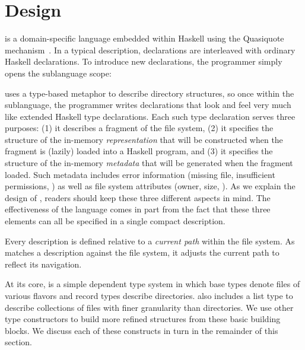 \section{\forest{} Design}
\label{sec:language}

\forest{} is a domain-specific language embedded within Haskell using
the Quasiquote mechanism~\cite{Mainland:quasi}.  In a typical
\forest{} description, \forest{} declarations are interleaved with ordinary
Haskell declarations.  To introduce new \forest{} declarations,
the programmer simply opens the \forest{} sublanguage scope:
\begin{code}
\end{code}

\forest{} uses a type-based metaphor to describe directory
structures, so once  within the \forest{} sublanguage, the programmer
writes declarations that look and feel very much like extended Haskell
type declarations. 
Each such type declaration serves three purposes: 
(1) it describes a fragment of the file system,
(2) it specifies the structure of the in-memory {\em representation}
    that will be constructed when the fragment is (lazily) loaded into a Haskell program, and 
(3) it specifies the structure of the in-memory {\em metadata}
    that will be generated when the fragment loaded.
Such metadata includes error information (missing file, insufficient
permissions, \etc{})  as well as file system attributes (owner, size, \etc{}).
As we explain the design of \forest{}, 
readers should keep these three different aspects in mind.  
The effectiveness of the \forest{} language comes in part from the fact that these three 
elements can all be specified in a single compact description.  

Every \forest{} description is defined relative to a
{\em current path} within the file system.  As 
\forest{} matches a description against the file system, it 
adjusts the current path to reflect its navigation.

At its core, \forest{} is a simple dependent type system in which base
types denote files of various flavors and record types describe
directories.  \forest{} also includes a list type to describe
collections of files with finer granularity than directories.  We use
other type constructors to build more refined structures from these
basic building blocks.  We discuss each of these constructs in turn in
the remainder of this section.

